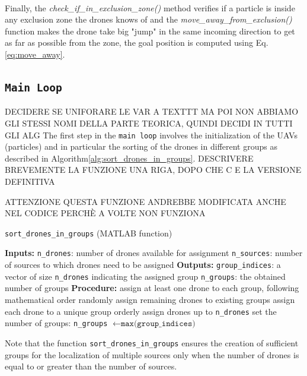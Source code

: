 \noindent\\
Finally, the
\textit{check\_if\_in\_exclusion\_zone()} 
method verifies if a particle is inside any 
exclusion zone the drones knows of and  
the \textit{move\_away\_from\_exclusion()} function
makes the drone take  big "jump" in the same incoming direction
to get as far as possible from the zone, the goal 
position is computed using Eq.\ref{eq:move_away}.

\subsection{\texttt{Main Loop}}
DECIDERE SE UNIFORARE LE VAR A TEXTTT MA POI NON ABBIAMO GLI 
STESSI NOMI DELLA PARTE TEORICA, QUINDI DECIDI IN TUTTI GLI ALG
The first step in the \texttt{main loop} involves the initialization
of the UAVs (particles) and in particular the sorting of 
the drones in different groups as described in Algorithm\ref{alg:sort_drones_in_groups}.
DESCRIVERE BREVEMENTE LA FUNZIONE UNA RIGA, DOPO CHE C E LA VERSIONE DEFINITIVA
\begin{algorithm}[H]
    ATTENZIONE QUESTA FUNZIONE ANDREBBE MODIFICATA ANCHE NEL CODICE
    PERCHÈ A VOLTE NON FUNZIONA
    \caption{\texttt{sort\_drones\_in\_groups} (MATLAB function)}\label{alg:sort_drones_in_groups}
    \begin{algorithmic}[1]
    \State \textbf{Inputs:}
    \State \texttt{n\_drones}: number of drones available for assignment
    \State \texttt{n\_sources}: number of sources to which drones need to be assigned
    \State \textbf{Outputs:}
    \State \texttt{group\_indices}: a vector of size \texttt{n\_drones} indicating the assigned group
    \State \texttt{n\_groups}: the obtained number of groups
    \State
    \State \textbf{Procedure:}
        \State assign at least one drone to each group, following mathematical order
        \State randomly assign remaining drones to existing groups
        \State assign each drone to a unique group
    \Else
        \State orderly assign drones up to \texttt{n\_drones}
    \EndIf
    \State set the number of groups: \texttt{n\_groups} $\gets \texttt{max(group\_indices)}$
    \end{algorithmic}
\end{algorithm}
\noindent Note that the function \texttt{sort\_drones\_in\_groups} ensures the creation of sufficient groups 
for the localization of multiple sources only when the number of drones is equal to or greater than 
the number of sources.


